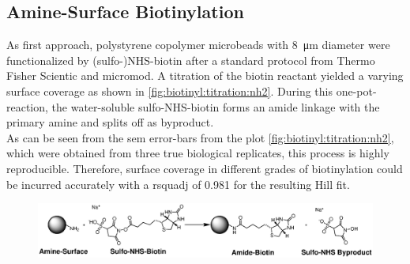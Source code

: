 \subsection{Amine-Surface Biotinylation}
As first approach, polystyrene copolymer microbeads with \SI{8}{\micro\meter} diameter were functionalized by (sulfo-)NHS-biotin after a standard protocol from Thermo Fisher Scientic and micromod. A titration of the biotin reactant yielded a varying surface coverage as shown in \cref{fig:biotinyl:titration:nh2}. During this one-pot-reaction, the water-soluble sulfo-NHS-biotin forms an \gls{amide} linkage with the primary \gls{amine} and  splits off as byproduct.\\
As can be seen from the \gls{sem} error-bars from the plot \ref{fig:biotinyl:titration:nh2}, which were obtained from three true biological replicates, this process is highly reproducible. Therefore, surface coverage in different grades of biotinylation could be incurred accurately with a \gls{rsquadj} of \num{0.981} for the resulting Hill fit.

\begin{figure}[h]
	\centering
	\includegraphics[width=\linewidth]{./Ressources/Chemistry/Sulfo-NHS.eps}
	\label{fig:Chem:NH2-NHS}
\end{figure}

\clearpage

